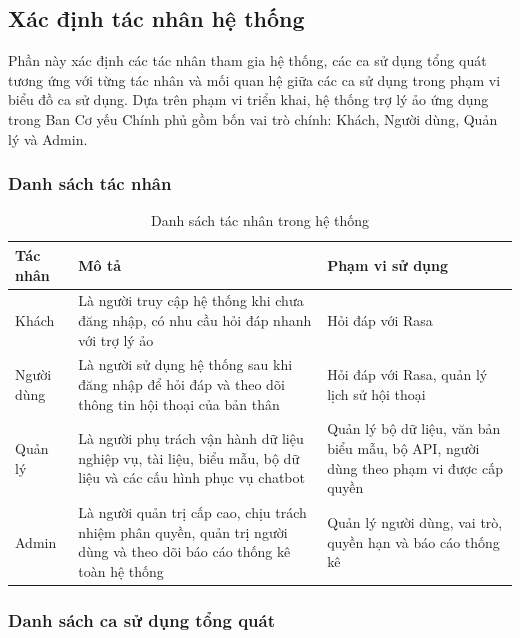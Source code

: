 \subsection{Xác định tác nhân hệ thống}

Phần này xác định các tác nhân tham gia hệ thống, các ca sử dụng tổng quát tương ứng với từng tác nhân và mối quan hệ giữa các ca sử dụng trong phạm vi biểu đồ ca sử dụng. Dựa trên phạm vi triển khai, hệ thống trợ lý ảo ứng dụng trong Ban Cơ yếu Chính phủ gồm bốn vai trò chính: Khách, Người dùng, Quản lý và Admin.

\subsubsection{Danh sách tác nhân}
\begin{table}[H]
\centering
\caption{Danh sách tác nhân trong hệ thống}
\label{tab:actors_list}
\begin{tabular}{|p{3.2cm}|p{6.8cm}|p{5cm}|}
\hline
\textbf{Tác nhân} & \textbf{Mô tả} & \textbf{Phạm vi sử dụng} \\ \hline
Khách & Là người truy cập hệ thống khi chưa đăng nhập, có nhu cầu hỏi đáp nhanh với trợ lý ảo & Hỏi đáp với Rasa \\ \hline
Người dùng & Là người sử dụng hệ thống sau khi đăng nhập để hỏi đáp và theo dõi thông tin hội thoại của bản thân & Hỏi đáp với Rasa, quản lý lịch sử hội thoại \\ \hline
Quản lý & Là người phụ trách vận hành dữ liệu nghiệp vụ, tài liệu, biểu mẫu, bộ dữ liệu và các cấu hình phục vụ chatbot & Quản lý bộ dữ liệu, văn bản biểu mẫu, bộ API, người dùng theo phạm vi được cấp quyền \\ \hline
Admin & Là người quản trị cấp cao, chịu trách nhiệm phân quyền, quản trị người dùng và theo dõi báo cáo thống kê toàn hệ thống & Quản lý người dùng, vai trò, quyền hạn và báo cáo thống kê \\ \hline
\end{tabular}
\end{table}

\subsubsection{Danh sách ca sử dụng tổng quát}

